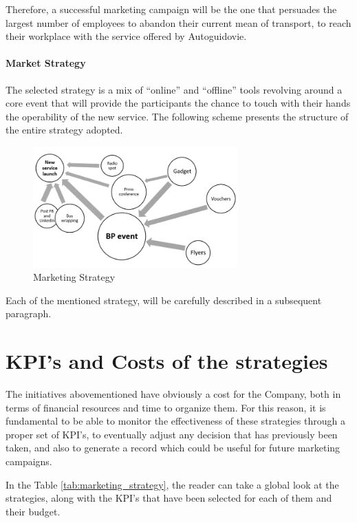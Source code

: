 Therefore, a successful marketing campaign will be the one that persuades the largest number of employees to abandon their current mean of transport, to reach their workplace with the service offered by Autoguidovie. 

\paragraph{Market Strategy}
The selected strategy is a mix of “online” and “offline” tools revolving around a core event that will provide the participants the chance to touch with their hands the operability of the new service. The following scheme presents the structure of the entire strategy adopted.

\begin{figure}[h]
    \centering
    \includegraphics[width=0.7\textwidth]{Images/merketing/Strategy.png}
    \caption{Marketing Strategy}
    \label{fig:strategy}
\end{figure}

Each of the mentioned strategy, will be carefully described in a subsequent paragraph.

\section{KPI's and Costs of the strategies}
The initiatives abovementioned have obviously a cost for the Company, both in terms of financial resources and time to organize them. For this reason, it is fundamental to be able to monitor the effectiveness of these strategies through a proper set of KPI’s, to eventually adjust any decision that has previously been taken, and also to generate a record which could be useful for future marketing campaigns.

In the Table \ref{tab:marketing_strategy}, the reader can take a global look at the strategies, along with the KPI’s that have been selected for each of them and their budget.


